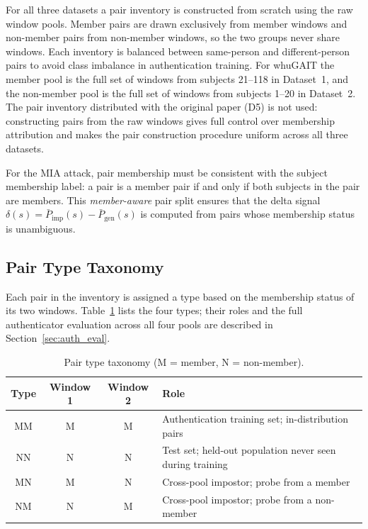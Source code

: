 For all three datasets a pair inventory is constructed from scratch using the raw window pools. Member pairs are drawn exclusively from member windows and non-member pairs from non-member windows, so the two groups never share windows. Each inventory is balanced between same-person and different-person pairs to avoid class imbalance in authentication training. For whuGAIT the member pool is the full set of windows from subjects 21--118 in Dataset~1, and the non-member pool is the full set of windows from subjects 1--20 in Dataset~2. The pair inventory distributed with the original paper (D5) is not used: constructing pairs from the raw windows gives full control over membership attribution and makes the pair construction procedure uniform across all three datasets.

For the MIA attack, pair membership must be consistent with the subject membership label: a pair is a member pair if and only if both subjects in the pair are members. This \emph{member-aware} pair split ensures that the delta signal $\delta(s) = \bar{P}_\text{imp}(s) - \bar{P}_\text{gen}(s)$ is computed from pairs whose membership status is unambiguous.

\subsection{Pair Type Taxonomy}
\label{ssec:sys_pair_types}

Each pair in the inventory is assigned a type based on the membership status of its two windows. Table~\ref{tab:pair_types} lists the four types; their roles and the full authenticator evaluation across all four pools are described in Section~\ref{sec:auth_eval}.

\begin{table}[htbp]
\centering
\caption{Pair type taxonomy (M = member, N = non-member).}
\label{tab:pair_types}
\begin{tabular}{cccl}
\toprule
Type & Window 1 & Window 2 & Role \\
\midrule
MM & M & M & Authentication training set; in-distribution pairs \\
NN & N & N & Test set; held-out population never seen during training \\
MN & M & N & Cross-pool impostor; probe from a member \\
NM & N & M & Cross-pool impostor; probe from a non-member \\
\bottomrule
\end{tabular}
\end{table}

